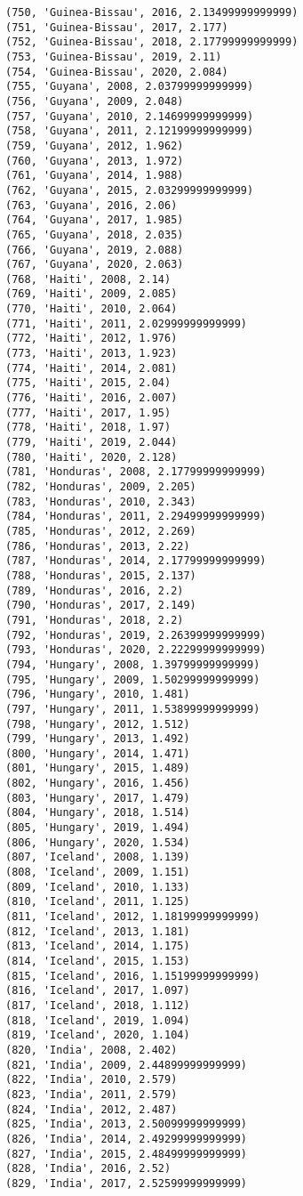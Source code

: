 \documentclass[11pt]{article}
\begin{document}
\begin{Verbatim}[commandchars=\\\{\}]
(750, 'Guinea-Bissau', 2016, 2.13499999999999)
(751, 'Guinea-Bissau', 2017, 2.177)
(752, 'Guinea-Bissau', 2018, 2.17799999999999)
(753, 'Guinea-Bissau', 2019, 2.11)
(754, 'Guinea-Bissau', 2020, 2.084)
(755, 'Guyana', 2008, 2.03799999999999)
(756, 'Guyana', 2009, 2.048)
(757, 'Guyana', 2010, 2.14699999999999)
(758, 'Guyana', 2011, 2.12199999999999)
(759, 'Guyana', 2012, 1.962)
(760, 'Guyana', 2013, 1.972)
(761, 'Guyana', 2014, 1.988)
(762, 'Guyana', 2015, 2.03299999999999)
(763, 'Guyana', 2016, 2.06)
(764, 'Guyana', 2017, 1.985)
(765, 'Guyana', 2018, 2.035)
(766, 'Guyana', 2019, 2.088)
(767, 'Guyana', 2020, 2.063)
(768, 'Haiti', 2008, 2.14)
(769, 'Haiti', 2009, 2.085)
(770, 'Haiti', 2010, 2.064)
(771, 'Haiti', 2011, 2.02999999999999)
(772, 'Haiti', 2012, 1.976)
(773, 'Haiti', 2013, 1.923)
(774, 'Haiti', 2014, 2.081)
(775, 'Haiti', 2015, 2.04)
(776, 'Haiti', 2016, 2.007)
(777, 'Haiti', 2017, 1.95)
(778, 'Haiti', 2018, 1.97)
(779, 'Haiti', 2019, 2.044)
(780, 'Haiti', 2020, 2.128)
(781, 'Honduras', 2008, 2.17799999999999)
(782, 'Honduras', 2009, 2.205)
(783, 'Honduras', 2010, 2.343)
(784, 'Honduras', 2011, 2.29499999999999)
(785, 'Honduras', 2012, 2.269)
(786, 'Honduras', 2013, 2.22)
(787, 'Honduras', 2014, 2.17799999999999)
(788, 'Honduras', 2015, 2.137)
(789, 'Honduras', 2016, 2.2)
(790, 'Honduras', 2017, 2.149)
(791, 'Honduras', 2018, 2.2)
(792, 'Honduras', 2019, 2.26399999999999)
(793, 'Honduras', 2020, 2.22299999999999)
(794, 'Hungary', 2008, 1.39799999999999)
(795, 'Hungary', 2009, 1.50299999999999)
(796, 'Hungary', 2010, 1.481)
(797, 'Hungary', 2011, 1.53899999999999)
(798, 'Hungary', 2012, 1.512)
(799, 'Hungary', 2013, 1.492)
(800, 'Hungary', 2014, 1.471)
(801, 'Hungary', 2015, 1.489)
(802, 'Hungary', 2016, 1.456)
(803, 'Hungary', 2017, 1.479)
(804, 'Hungary', 2018, 1.514)
(805, 'Hungary', 2019, 1.494)
(806, 'Hungary', 2020, 1.534)
(807, 'Iceland', 2008, 1.139)
(808, 'Iceland', 2009, 1.151)
(809, 'Iceland', 2010, 1.133)
(810, 'Iceland', 2011, 1.125)
(811, 'Iceland', 2012, 1.18199999999999)
(812, 'Iceland', 2013, 1.181)
(813, 'Iceland', 2014, 1.175)
(814, 'Iceland', 2015, 1.153)
(815, 'Iceland', 2016, 1.15199999999999)
(816, 'Iceland', 2017, 1.097)
(817, 'Iceland', 2018, 1.112)
(818, 'Iceland', 2019, 1.094)
(819, 'Iceland', 2020, 1.104)
(820, 'India', 2008, 2.402)
(821, 'India', 2009, 2.44899999999999)
(822, 'India', 2010, 2.579)
(823, 'India', 2011, 2.579)
(824, 'India', 2012, 2.487)
(825, 'India', 2013, 2.50099999999999)
(826, 'India', 2014, 2.49299999999999)
(827, 'India', 2015, 2.48499999999999)
(828, 'India', 2016, 2.52)
(829, 'India', 2017, 2.52599999999999)

\end{Verbatim}
\end{document}
